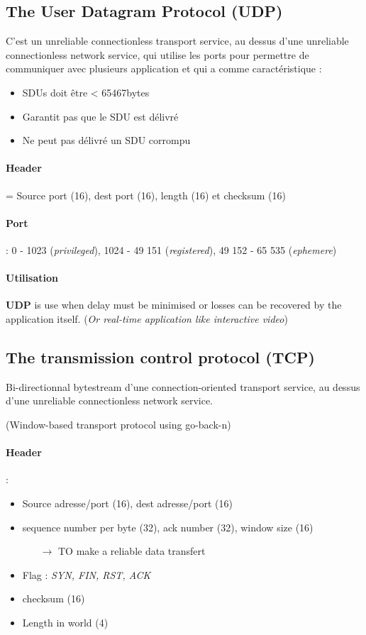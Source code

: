 \subsection{The User Datagram Protocol (UDP)}
C'est un unreliable connectionless transport service, au dessus d'une unreliable
connectionless network service, qui utilise les ports
pour permettre de communiquer avec plusieurs application et qui a comme
caractéristique :

\begin{itemize}
    \item SDUs doit être < 65467bytes
    \item Garantit pas que le SDU est délivré
    \item Ne peut pas délivré un SDU corrompu
\end{itemize}

\paragraph{Header} = Source port (16), dest port (16), length (16) et checksum (16)

\paragraph{Port} : 0 - 1023 (\textit{privileged}), 1024 - 49 151 (\textit{registered}),
49 152 - 65 535 (\textit{ephemere})

\paragraph{Utilisation} 
\textbf{UDP} is use when delay must be minimised or losses can be recovered by the application
itself. (\textit{Or real-time application like interactive video})


\subsection{The transmission control protocol (TCP)}
Bi-directionnal bytestream d'une connection-oriented transport service, au dessus d'une unreliable connectionless network service.

(Window-based transport protocol using go-back-n)

\paragraph{Header} :
\begin{itemize}
    \item Source adresse/port (16), dest adresse/port (16)
    \item sequence number per byte (32), ack number (32), window size (16)
        \begin{itemize}
            \item[$\to$] TO make a reliable data transfert
        \end{itemize}
    \item Flag : \textit{SYN, FIN, RST, ACK}
    \item checksum (16)
    \item Length in world (4)
\end{itemize}

